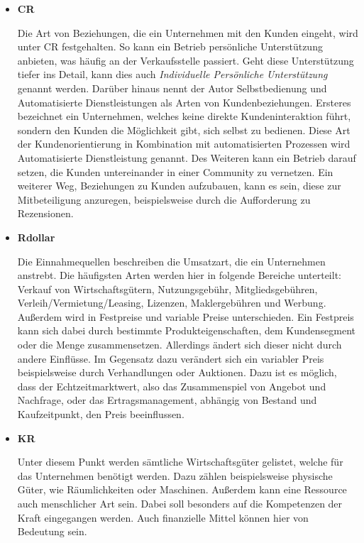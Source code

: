 \begin{itemize}
	\item \textbf{\ac{CR}}
	
	Die Art von Beziehungen, die ein Unternehmen mit den Kunden eingeht, wird unter \acs{CR} festgehalten. So kann ein Betrieb persönliche Unterstützung anbieten, was häufig an der Verkaufsstelle passiert. Geht diese Unterstützung tiefer ins Detail, kann dies auch \textit{Individuelle Persönliche Unterstützung} genannt werden. Darüber hinaus nennt der Autor Selbstbedienung und Automatisierte Dienstleistungen als Arten von Kundenbeziehungen. Ersteres bezeichnet ein Unternehmen, welches keine direkte Kundeninteraktion führt, sondern den Kunden die Möglichkeit gibt, sich selbst zu bedienen. Diese Art der Kundenorientierung in Kombination mit automatisierten Prozessen wird Automatisierte Dienstleistung genannt. Des Weiteren kann ein Betrieb darauf setzen, die Kunden untereinander in einer Community zu vernetzen. Ein weiterer Weg, Beziehungen zu Kunden aufzubauen, kann es sein, diese zur Mitbeteiligung anzuregen, beispielsweise durch die Aufforderung zu Rezensionen.
	
	\item \textbf{\ac{Rdollar}}
	
	Die Einnahmequellen beschreiben die Umsatzart, die ein Unternehmen anstrebt. Die häufigsten Arten werden hier in folgende Bereiche unterteilt: Verkauf von Wirtschaftsgütern, Nutzungsgebühr, Mitgliedsgebühren, Verleih/Vermietung/Leasing, Lizenzen, Maklergebühren und Werbung. Außerdem wird in Festpreise und variable Preise unterschieden. Ein Festpreis kann sich dabei durch bestimmte Produkteigenschaften, dem Kundensegment oder die Menge zusammensetzen. Allerdings ändert sich dieser nicht durch andere Einflüsse. Im Gegensatz dazu verändert sich ein variabler Preis beispielsweise durch Verhandlungen oder Auktionen. Dazu ist es möglich, dass der Echtzeitmarktwert, also das Zusammenspiel von Angebot und Nachfrage, oder das Ertragsmanagement, abhängig von Bestand und Kaufzeitpunkt, den Preis beeinflussen.
	
	
	\item \textbf{\ac{KR}}
	
	Unter diesem Punkt werden sämtliche Wirtschaftsgüter gelistet, welche für das Unternehmen benötigt werden. Dazu zählen beispielsweise physische Güter, wie Räumlichkeiten oder Maschinen. Außerdem kann eine Ressource auch menschlicher Art sein. Dabei soll besonders auf die Kompetenzen der Kraft eingegangen werden. Auch finanzielle Mittel können hier von Bedeutung sein.
	

\end{itemize}
